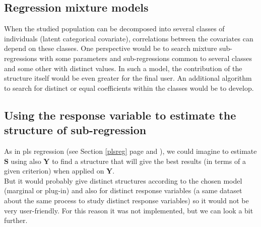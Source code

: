 \documentclass[12pt,a4paper]{report}
\begin{document}
			\subsection{Regression mixture models}
			When the studied population can be decomposed into several classes of individuals (latent categorical covariate), correlations between the covariates can depend on these classes. One perspective would be to search mixture sub-regressions \cite{de1989mixtures} with some parameters and sub-regressions common to several classes and some other with distinct values. In such a model, the contribution of the structure itself would be even greater for the final user. An additional algorithm to search for distinct or equal coefficients within the classes would be to develop.
			\subsection{Using the response variable to estimate the structure of sub-regression}
			As in {\sc pls} regression (see Section \ref{plsreg} page \pageref{plsreg} and \cite{abdi2003partial,geladi1986partial}), we could imagine to estimate $\boldsymbol{S}$ using also $\boldsymbol{Y}$ to find a structure that will give the best results (in terms of a given criterion) when applied on $\boldsymbol{Y}$.\\
			
			 But it would probably give distinct structures according to the chosen model (marginal or plug-in) and also for distinct response variables (a same dataset about the same process to study distinct response variables) so it would not be very user-friendly. For this reason it was not implemented, but we can look a bit further.\\
			 
\end{document}
